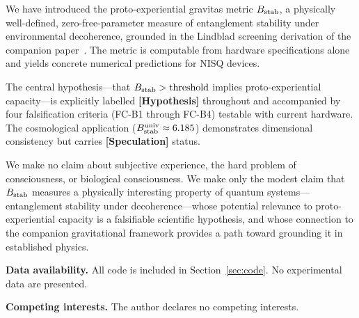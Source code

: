 \documentclass[12pt,letterpaper]{article}
\theoremstyle{definition}
\theoremstyle{remark}
\newcommand{\hypothesis}{\textbf{[Hypothesis]}}
\newcommand{\speculation}{\textbf{[Speculation]}}
\newcommand{\Bstab}{B_{\rm stab}}
\begin{document}
We have introduced the proto-experiential gravitas metric $\Bstab$, a physically
well-defined, zero-free-parameter measure of entanglement stability under environmental
decoherence, grounded in the Lindblad screening derivation of the companion
paper~\cite{companion}.
The metric is computable from hardware specifications alone and yields concrete
numerical predictions for NISQ devices.

The central hypothesis---that $\Bstab > \text{threshold}$ implies proto-experiential
capacity---is explicitly labelled \hypothesis{} throughout and accompanied by four
falsification criteria (FC-B1 through FC-B4) testable with current hardware.
The cosmological application ($\Bstab^{\rm univ}\approx 6.185$) demonstrates
dimensional consistency but carries \speculation{} status.

We make no claim about subjective experience, the hard problem of consciousness, or
biological consciousness.
We make only the modest claim that $\Bstab$ measures a physically interesting
property of quantum systems---entanglement stability under decoherence---whose
potential relevance to proto-experiential capacity is a falsifiable scientific
hypothesis, and whose connection to the companion gravitational framework provides
a path toward grounding it in established physics.

\bigskip\noindent\textbf{Data availability.}
All code is included in Section~\ref{sec:code}. No experimental data are presented.

\bigskip\noindent\textbf{Competing interests.}
The author declares no competing interests.
\end{document}
